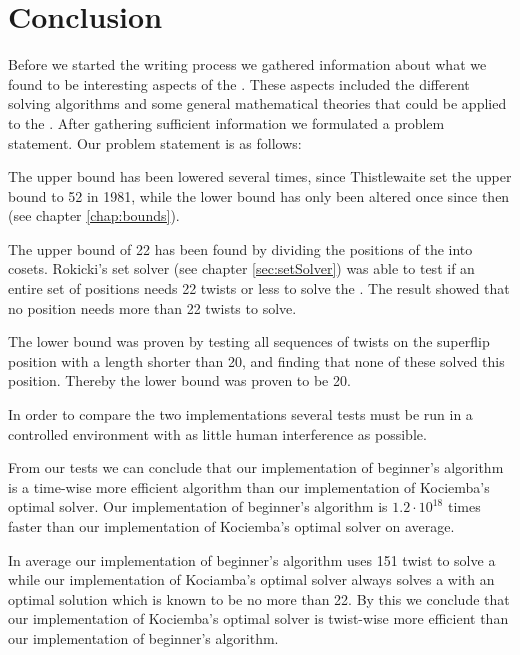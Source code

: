 \chapter{Conclusion}
Before we started the writing process we gathered information about what we found to be interesting aspects of the \rubik{}. 
These aspects included the different solving algorithms and some general mathematical theories that could be applied to the \rubik{}.
After gathering sufficient information we formulated a problem statement. Our problem statement is as follows:


\linebreak
The upper bound has been lowered several times, since Thistlewaite set the upper bound to 52 in 1981, while the lower bound has only been altered once since then (see chapter \ref{chap:bounds}).

The upper bound of 22 has been found by dividing the positions of the \rubik{} into cosets.  Rokicki's set solver (see chapter \ref{sec:setSolver}) was able to test if an entire set of positions needs 22 twists or less to solve the \rubik{}. The result showed that no \rubik{} position needs more than 22 twists to solve.

The lower bound was proven by testing all sequences of twists on the superflip position with a length shorter than 20, and finding that none of these solved this position. Thereby the lower bound was proven to be 20. 


In order to compare the two implementations several tests must be run in a controlled environment with as little human interference as possible. 

From our tests we can conclude that our implementation of beginner's algorithm is a time-wise more efficient algorithm than our implementation of Kociemba's optimal solver. 
Our implementation of beginner's algorithm is $1.2\cdot10^{18}$ times faster than our implementation of Kociemba's optimal solver on average. 

In average our implementation of beginner's algorithm uses 151 twist to solve a \cube{} while our implementation of Kociamba's optimal solver always solves a \cube{} with an optimal solution which is known to be no more than 22. 
By this we conclude that our implementation of Kociemba's optimal solver is twist-wise more efficient than our implementation of beginner's algorithm. 




